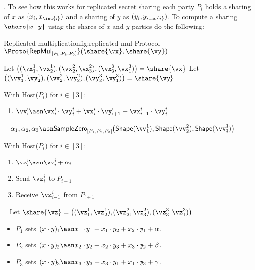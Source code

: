 . 
To see how this works for replicated secret sharing each party $P_i$ holds a
sharing of $x$ as $(x_i, x_{ \inc{i} })$ and a sharing of $y$ as $(y_i, y_{
\inc{i} })$. To compute a sharing $\share{x \cdot y}$ using the shares of $x$
and $y$ parties do the following:



\begin{Boxfig}{Replicated multiplication}{fig:replicated-mul}
  {Protocol $\Proto{\mathsf{RepMul}_{[P_1, P_2, P_3]}}(\share{\vx}, \share{\vy})$}
  
  Let $\big((\vx_1^1, \vx_2^1), (\vx_2^2, \vx_3^2), (\vx_3^3, \vx_1^3) \big) = \share{\vx}$ \newline
  Let $\big((\vy_1^1, \vy_2^1), (\vy_2^2, \vy_3^2), (\vy_3^3, \vy_1^3) \big) = \share{\vy}$ \newline
  
  With Host($P_i$) for $i \in [3]$:
  \begin{enumerate}
    \item $\vv_i^i \asn \vx_i^i \cdot \vy_i^i + \vx_i^i \cdot \vy_{i+1}^i + \vx_{i+1}^i \cdot \vy_i^i$
  \end{enumerate}
  ~\newline
  $\alpha_1, \alpha_2, \alpha_3 \asn \mathsf{SampleZero}_{[P_1, P_2, P_3]}\big( \mathsf{Shape}(\vv_1^1), \mathsf{Shape}\mathsf(\vv_2^2), \mathsf{Shape}\mathsf(\vv_3^3) \big)$
  ~\newline

  With Host($P_i$) for $i \in [3]$:
  \begin{enumerate}
    \item $\vz_i^i \asn \vv_i^i + \alpha_i$
    \item Send $\vz_i^i$ to $P_{i-1}$
    \item Receive $\vz_{i+1}^i$ from $P_{i+1}$
  \end{enumerate}
  ~\newline
  Let $\share{\vz} = \big((\vz_1^1, \vz_2^1), (\vz_2^2, \vz_3^2), (\vz_3^3, \vz_1^3) \big)$
\end{Boxfig}

\begin{itemize}
    \item $P_1$ sets $(x \cdot y)_{1} \asn x_1 \cdot y_1 + x_1 \cdot y_2 + x_2 \cdot
    y_1 + \alpha$.
    \item $P_2$ sets $(x \cdot y)_2 \asn x_2 \cdot y_2 + x_2 \cdot y_3 + x_3
    \cdot y_2 + \beta$.
    \item $P_3$ sets $(x \cdot y)_3 \asn x_3 \cdot y_3 + x_3 \cdot y_1 + x_1 \cdot y_3 +
    \gamma$.
\end{itemize}

